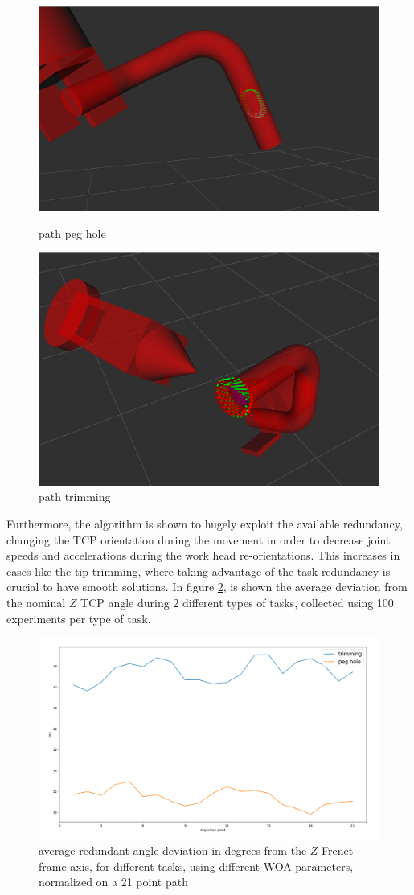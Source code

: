 \documentclass[twocolumn]{svjour3}
\begin{document}
\begin{figure}[h]
		\includegraphics[width=0.8\linewidth]{scr1}
		\caption{path peg hole}
		\label{fig:sfig6}
		\includegraphics[width=0.8\linewidth]{scr2}
		\caption{path trimming}
		\label{fig:sfig7}
\end{figure}

Furthermore, the algorithm is shown to hugely exploit the available redundancy, changing the TCP orientation during the movement in order to decrease joint speeds and accelerations during the work head re-orien\-tations. 
This increases in cases like the tip trimming, where taking advantage of the task redundancy is crucial to have smooth solutions.
In figure \ref{fig:sfig8}, is shown the average deviation from the nominal $Z$ TCP angle during 2 different types of tasks, collected using 100 experiments per type of task.


\begin{figure}[h]
		\includegraphics[width=1\linewidth]{red}
		\caption{average redundant angle deviation in degrees from the $Z$ Frenet frame axis, for different tasks, using different WOA parameters, normalized on a 21 point path}
		\label{fig:sfig8}
\end{figure}
\end{document}
